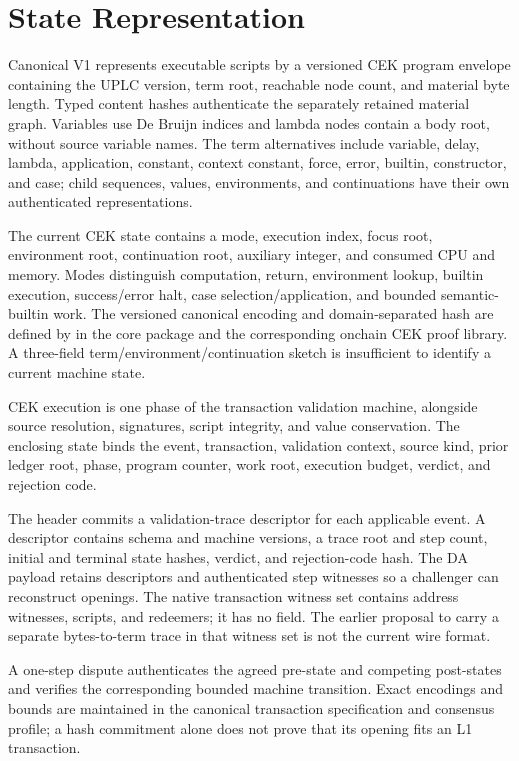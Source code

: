 \documentclass[../midgard.tex]{subfiles}
\begin{document}
\section{State Representation}
\label{s:phase-two-state-representation}

Canonical V1 represents executable scripts by a versioned CEK program envelope containing the UPLC version, term root, reachable node count, and material byte length. Typed content hashes authenticate the separately retained material graph. Variables use De Bruijn indices and lambda nodes contain a body root, without source variable names. The term alternatives include variable, delay, lambda, application, constant, context constant, force, error, builtin, constructor, and case; child sequences, values, environments, and continuations have their own authenticated representations.

The current CEK state contains a mode, execution index, focus root, environment root, continuation root, auxiliary integer, and consumed CPU and memory. Modes distinguish computation, return, environment lookup, builtin execution, success/error halt, case selection/application, and bounded semantic-builtin work. The versioned canonical encoding and domain-separated hash are defined by  in the core package and the corresponding onchain CEK proof library. A three-field term/environment/continuation sketch is insufficient to identify a current machine state.

CEK execution is one phase of the transaction validation machine, alongside source resolution, signatures, script integrity, and value conservation. The enclosing state binds the event, transaction, validation context, source kind, prior ledger root, phase, program counter, work root, execution budget, verdict, and rejection code.

The header commits a validation-trace descriptor for each applicable event. A descriptor contains schema and machine versions, a trace root and step count, initial and terminal state hashes, verdict, and rejection-code hash. The DA payload retains descriptors and authenticated step witnesses so a challenger can reconstruct openings. The native transaction witness set contains address witnesses, scripts, and redeemers; it has no  field. The earlier proposal to carry a separate bytes-to-term trace in that witness set is not the current wire format.

A one-step dispute authenticates the agreed pre-state and competing post-states and verifies the corresponding bounded machine transition. Exact encodings and bounds are maintained in the canonical transaction specification and consensus profile; a hash commitment alone does not prove that its opening fits an L1 transaction.
\end{document}
